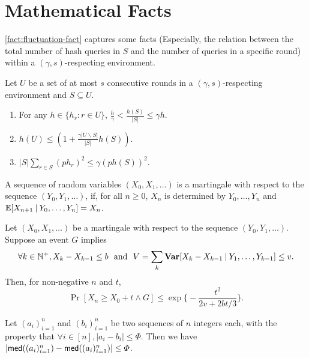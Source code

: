 \section{Mathematical Facts}
\label{sec:math-facts}

\cref{fact:fluctuation-fact} captures some facts (Especially, the relation between the total number of hash queries in $S$ and the number of queries in a specific round) within a $(\gamma, s)$-respecting environment.

\begin{fact} \label{fact:fluctuation-fact}
    Let $U$ be a set of at most $s$ consecutive rounds in a $(\gamma, s)$-respecting environment and $S \subseteq U$.
    \begin{enumerate}[label=(\alph*), leftmargin=*, nosep]
        \item For any $h \in \{ h_r : r \in U\}$, $\frac{h}{\gamma} < \frac{h(S)}{|S|} \le \gamma h$.
        \item $h(U) \le (1 + \frac{\gamma |U \backslash S|}{|S|} h(S))$.
        \item $|S| \sum_{r \in S} (p h_r)^2 \le \gamma (p h(S))^2$.
    \end{enumerate}
\end{fact}

\begin{definition} \label{def:martingale-sequence}
    \emph{\cite[Definition 5.3]{DubPan09}}
    A sequence of random variables $(X_0, X_1, \ldots)$ is a martingale with respect to the sequence $(Y_0, Y_1, \ldots)$, if, for all $n \ge 0$, $X_n$
    is determined by $Y_0, \ldots , Y_n$ and $\mathbb{E} [X_{n+1} \mathbin| Y_0, \ldots , Y_n] = X_n$.
\end{definition}

\begin{theorem} \label{thm:martingale-bound}
    Let $(X_0, X_1, \ldots)$ be a martingale with respect to the sequence $(Y_0, Y_1, \ldots)$.
    Suppose an event $G$ implies
    \[ \forall k \in \mathbb{N}^+, X_k - X_{k - 1} \le b ~~\text{and}~~ V = \sum_k \mathbf{Var} [X_k - X_{k - 1} \mathbin| Y_1, \ldots, Y_{k - 1}] \le v. \]
    Then, for non-negative $n$ and $t$,
    \[ \Pr [X_n \ge X_0 + t \wedge G] \le \exp \Big\{ - \frac{t^2}{2v + 2bt / 3} \Big\}. \]
\end{theorem}

\begin{fact} \label{fact:seq-med}
    Let $(a_i)^n_{i = 1}$ and $(b_i)^n_{i = 1}$ be two sequences of $n$ integers each, with the property that $\forall i \in [n], |a_i - b_i| \le \varPhi$.
    Then we have $| \mathsf{med}((a_i)^n_{i = 1}) - \mathsf{med}((a_i)^n_{i = 1})| \le \varPhi$.
\end{fact}
